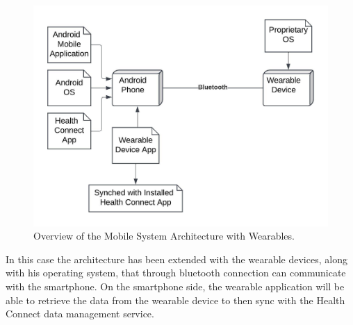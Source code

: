 \begin{figure}
    \includegraphics[width=1.0\linewidth]{./images/system_architecture_wearable.jpeg}
    \caption{Overview of the Mobile System Architecture with Wearables.}
    \label{fig:systemArchitectureWearables}
\end{figure}

\noindent In this case the architecture has been extended with the wearable devices, along with his operating system, that through bluetooth connection can communicate with the smartphone. On the smartphone side, the wearable application will be able to retrieve the data from the wearable device to then sync with the Health Connect data management service.
\newpage